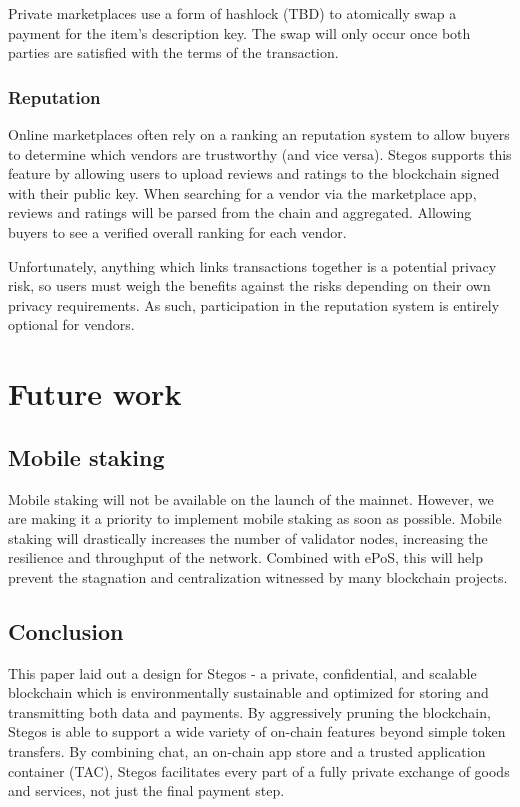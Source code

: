 \documentclass[8pt,fleqn,openany]{book}
\begin{document}
Private marketplaces use a form of hashlock (TBD) to atomically swap a payment for the item’s description key. The swap will only occur once both parties are satisfied with the terms of the transaction.

\subsection{Reputation}
Online marketplaces often rely on a ranking an reputation system to allow buyers to determine which vendors are trustworthy (and vice versa). Stegos supports this feature by allowing users to upload reviews and ratings to the blockchain signed with their public key. When searching for a vendor via the marketplace app, reviews and ratings will be parsed from the chain and aggregated. Allowing buyers to see a verified overall ranking for each vendor.

Unfortunately, anything which links transactions together is a potential privacy risk, so users must weigh the benefits against the risks depending on their own privacy requirements. As such, participation in the reputation system is entirely optional for vendors.

\chapter{Future work}\label{chap:future-work}

\section{Mobile staking}\label{sec:mobile-staking}
Mobile staking will not be available on the launch of the mainnet. However, we are making it a priority to implement mobile staking as soon as possible. Mobile staking will drastically increases the number of validator nodes, increasing the resilience and throughput of the network. Combined with ePoS, this will help prevent the stagnation and centralization witnessed by many blockchain projects.
	
\section{Conclusion}
This paper laid out a design for Stegos - a private, confidential, and scalable blockchain which is environmentally sustainable and optimized for storing and transmitting both data and payments. By aggressively pruning the blockchain, Stegos is able to support a wide variety of on-chain features beyond simple token transfers. By combining chat, an on-chain app store and a trusted application container (TAC), Stegos facilitates every part of a fully private exchange of goods and services, not just the final payment step.
\end{document}
